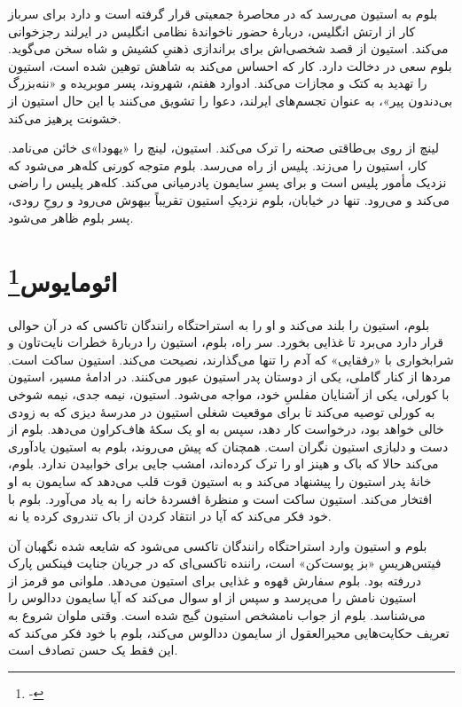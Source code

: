 \documentclass[12pt]{book}
\begin{document}
    بلوم به استیون می‌رسد که در محاصرۀ جمعیتی قرار گرفته است و دارد برای سرباز کار از ارتش انگلیس، دربارۀ حضور ناخواندۀ نظامی انگلیس در ایرلند رجزخوانی می‌کند. استیون از قصد شخصی‌اش برای براندازی ذهنیِ کشیش و شاه سخن می‌گوید. بلوم سعی در دخالت دارد. کار که احساس می‌کند به شاهش توهین شده است، استیون را تهدید به کتک و مجازات می‌کند. ادوارد هفتم، شهروند، پسر موبریده و «ننه‌بزرگ بی‌دندون پیر»، به عنوان تجسم‌های ایرلند، دعوا را تشویق می‌کنند با این حال استیون از خشونت پرهیز می‌کند.

    لینچ از روی بی‌طاقتی صحنه را ترک می‌کند. استیون، لینچ را «یهودا»ی خائن می‌نامد. کار، استیون را می‌زند. پلیس از راه می‌رسد. بلوم متوجه کورنی کله‌هر می‌شود که نزدیک مأمور پلیس است و برای پسرِ سایمون پادرمیانی می‌کند. کله‌هر پلیس را راضی می‌کند و می‌رود. تنها در خیابان، بلوم نزدیکِ استیون تقریباً بیهوش می‌رود و روحِ رودی، پسر بلوم ظاهر می‌شود.

    \chapter[ائومایوس]{ائومایوس\protect\footnote{-}}\label{ep:16}
    بلوم، استیون را بلند می‌کند و او را به استراحتگاه رانندگان تاکسی که در آن حوالی قرار دارد می‌برد تا غذایی بخورد. سر راه، بلوم، استیون را دربارۀ خطرات نایت‌تاون و شرابخواری با «رفقایی» که آدم را تنها می‌گذارند، نصیحت می‌کند. استیون ساکت است. مردها از کنار گاملی، یکی از دوستان پدر استیون عبور می‌کنند. در ادامۀ مسیر، استیون با کورلی، یکی از آشنایان مفلسِ خود، مواجه می‌شود. استیون، نیمه جدی، نیمه شوخی به کورلی توصیه می‌کند تا برای موقعیت شغلی استیون در مدرسۀ دیزی که به زودی خالی خواهد بود، درخواست کار دهد، سپس به او یک سکۀ هاف‌کراون می‌دهد. بلوم از دست و دلبازی استیون نگران است. همچنان که پیش می‌روند، بلوم به استیون یادآوری می‌کند حالا که باک و هینز او را ترک کرده‌اند، امشب جایی برای خوابیدن ندارد. بلوم، خانۀ پدر استیون را پیشنهاد می‌کند و به استیون قوت قلب می‌دهد که سایمون به او افتخار می‌کند. استیون ساکت است و منظرۀ افسردۀ خانه را به یاد می‌آورد. بلوم با خود فکر می‌کند که آیا در انتقاد کردن از باک تندروی کرده یا نه.

    بلوم و استیون وارد استراحتگاه رانندگان تاکسی می‌شود که شایعه شده نگهبان آن فیتس‌هریسِ «بز پوست‌کن» است، راننده تاکسی‌ای که در جریان جنایت فینکس پارک دررفته بود. بلوم سفارش قهوه و غذایی برای استیون می‌دهد. ملوانی مو قرمز از استیون نامش را می‌پرسد و سپس از او سوال می‌کند که آیا سایمون ددالوس را می‌شناسد. بلوم از جواب نامشخص استیون گیج شده است. وقتی ملوان شروع به تعریف حکایت‌هایی محیرالعقول از سایمون ددالوس می‌کند، بلوم با خود فکر می‌کند که این فقط یک حسن تصادف است.
\end{document}
